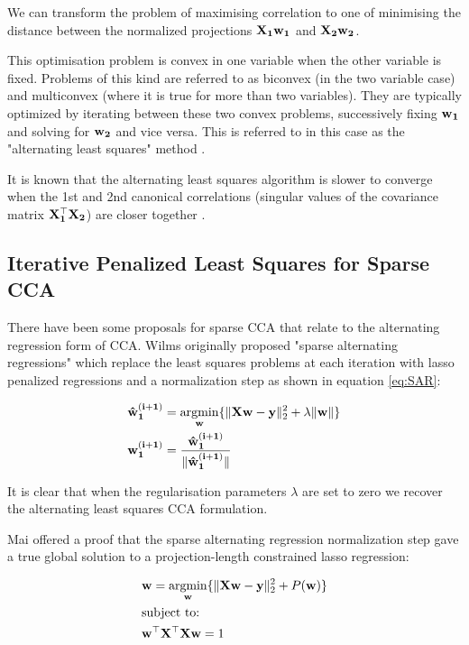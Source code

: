 We can transform the problem of maximising correlation to one of minimising the distance between the normalized projections $\bold{X_1w_1}$ and $\bold{X_2w_2}$.

This optimisation problem is convex in one variable when the other variable is fixed. Problems of this kind are referred to as biconvex (in the two variable case) and multiconvex (where it is true for more than two variables). They are typically optimized by iterating between these two convex problems, successively fixing $\bold{w_1}$ and solving for $\bold{w_2}$ and vice versa. This is referred to in this case as the "alternating least squares" method \cite{lykou2010sparse}.

It is known that the alternating least squares algorithm is slower to converge when the 1st and 2nd canonical correlations (singular values of the covariance matrix $\bold{X_1^{\top}X_2}$) are closer together \cite{venkatg}.

\subsection{Iterative Penalized Least Squares for Sparse CCA}

There have been some proposals for sparse CCA that relate to the alternating regression form of CCA. Wilms originally proposed "sparse alternating regressions" \cite{wilms2015sparse} which replace the least squares problems at each iteration with lasso penalized regressions and a normalization step as shown in equation \ref{eq:SAR}:

\begin{align}
    \label{eq:SAR}
    & \bold{\hat{w}^{(i+1)}_1}=\underset{\bold{w}}{\mathrm{argmin}}\{ \|\bold{Xw-y}\|^2_2 + \lambda\|\bold{w}\| \}\\
    & \bold{w^{(i+1)}_1}=\bold{\frac{\hat{w}^{(i+1)}_1}{\|\hat{w}^{(i+1)}_1\|}}
\end{align}

It is clear that when the regularisation parameters $\lambda$ are set to zero we recover the alternating least squares CCA formulation.

Mai offered a proof that the sparse alternating regression normalization step gave a true global solution to a projection-length constrained lasso regression\cite{mai2019iterative}:

\begin{align}
    & \bold{w}=\underset{\bold{w}}{\mathrm{argmin}}\{ \|\bold{Xw-y}\|^2_2 + P(\bold{w}) \}\\
    & \text{subject to:} \notag\\
    & \bold{w^{\top}X^{\top}Xw}=1 \notag
\end{align}

